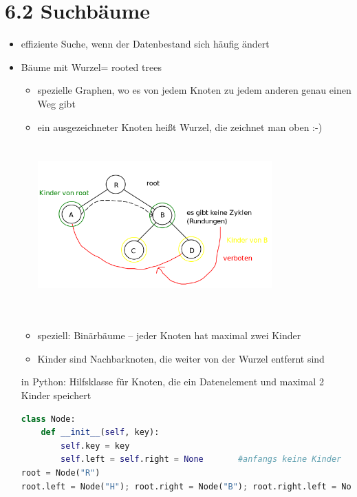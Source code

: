\documentclass[11pt, fleqn]{scrreprt}
\begin{document}
		\section*{6.2 Suchbäume}
		
		\begin{itemize}
			\item effiziente Suche, wenn der Datenbestand sich häufig ändert
			\item \glqq Bäume mit Wurzel\grqq = rooted trees \\
			\begin{itemize}
				\item spezielle Graphen, wo es von jedem Knoten zu jedem anderen genau einen Weg gibt
				\item ein ausgezeichneter Knoten heißt \glqq Wurzel\grqq , die zeichnet man oben :-)\\
				\includegraphics[width=9cm,height=7cm,keepaspectratio]{./Pictures/binaerBaum.png}
				\item speziell: Binärbäume – jeder Knoten hat maximal zwei Kinder
				\item Kinder sind Nachbarknoten, die weiter von der Wurzel entfernt sind
			\end{itemize}
			in Python: Hilfsklasse für Knoten, die ein Datenelement und maximal 2 Kinder speichert
			
\begin{lstlisting}[language=Python]
class Node:
	def __init__(self, key):
		self.key = key
		self.left = self.right = None       #anfangs keine Kinder
root = Node("R")
root.left = Node("H"); root.right = Node("B"); root.right.left = Node("C")
\end{lstlisting}
		\end{itemize}
	
\end{document}
